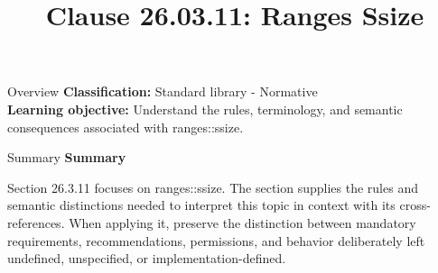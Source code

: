 \documentclass[10pt,letterpaper]{article}
\title{Clause 26.03.11: Ranges Ssize}
\author{}
\date{}
\begin{document}
\maketitle
\begin{CornellOverviewBox}{Overview}
\textbf{Classification:} Standard library - Normative\\[2pt]
\textbf{Learning objective:} Understand the rules, terminology, and semantic consequences associated with ranges::ssize.
\end{CornellOverviewBox}\begin{CornellSummaryBox}{Summary}
{\sffamily\bfseries\color{Accent} Summary}\par\vspace{3pt}Section 26.3.11 focuses on ranges::ssize. The section supplies the rules and semantic distinctions needed to interpret this topic in context with its cross-references. When applying it, preserve the distinction between mandatory requirements, recommendations, permissions, and behavior deliberately left undefined, unspecified, or implementation-defined.
\end{CornellSummaryBox}
\end{document}
